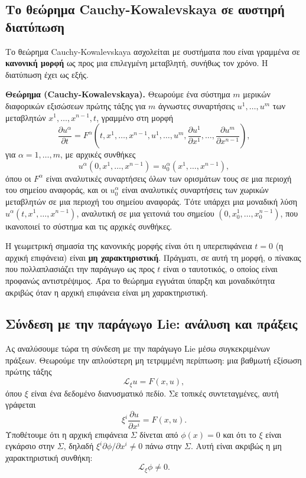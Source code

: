 \documentclass[12pt]{article}
\begin{document}
\subsection{Το θεώρημα Cauchy-Kowalevskaya σε αυστηρή διατύπωση}

Το θεώρημα Cauchy-Kowalevskaya ασχολείται με συστήματα που είναι γραμμένα σε \textbf{κανονική μορφή} ως προς μια επιλεγμένη μεταβλητή, συνήθως τον χρόνο. Η διατύπωση έχει ως εξής.

\textbf{Θεώρημα (Cauchy-Kowalevskaya).} Θεωρούμε ένα σύστημα $m$ μερικών διαφορικών εξισώσεων πρώτης τάξης για $m$ άγνωστες συναρτήσεις $u^1, \dots, u^m$ των μεταβλητών $x^1, \dots, x^{n-1}, t$, γραμμένο στη μορφή
\begin{equation}
\frac{\partial u^\alpha}{\partial t} = F^\alpha \left( t, x^1, \dots, x^{n-1}, u^1, \dots, u^m, \frac{\partial u^1}{\partial x^1}, \dots, \frac{\partial u^m}{\partial x^{n-1}} \right),
\end{equation}
για $\alpha = 1, \dots, m$, με αρχικές συνθήκες
\begin{equation}
u^\alpha(0, x^1, \dots, x^{n-1}) = u_0^\alpha(x^1, \dots, x^{n-1}),
\end{equation}
όπου οι $F^\alpha$ είναι αναλυτικές συναρτήσεις όλων των ορισμάτων τους σε μια περιοχή του σημείου αναφοράς, και οι $u_0^\alpha$ είναι αναλυτικές συναρτήσεις των χωρικών μεταβλητών σε μια περιοχή του σημείου αναφοράς. Τότε υπάρχει μια μοναδική λύση $u^\alpha(t, x^1, \dots, x^{n-1})$, αναλυτική σε μια γειτονιά του σημείου $(0, x_0^1, \dots, x_0^{n-1})$, που ικανοποιεί το σύστημα και τις αρχικές συνθήκες.

Η γεωμετρική σημασία της κανονικής μορφής είναι ότι η υπερεπιφάνεια $t = 0$ (η αρχική επιφάνεια) είναι \textbf{μη χαρακτηριστική}. Πράγματι, σε αυτή τη μορφή, ο πίνακας που πολλαπλασιάζει την παράγωγο ως προς $t$ είναι ο ταυτοτικός, ο οποίος είναι προφανώς αντιστρέψιμος. Άρα το θεώρημα εγγυάται ύπαρξη και μοναδικότητα ακριβώς όταν η αρχική επιφάνεια είναι μη χαρακτηριστική.

\subsection{Σύνδεση με την παράγωγο Lie: ανάλυση και πράξεις}

Ας αναλύσουμε τώρα τη σύνδεση με την παράγωγο Lie μέσω συγκεκριμένων πράξεων. Θεωρούμε την απλούστερη μη τετριμμένη περίπτωση: μια βαθμωτή εξίσωση πρώτης τάξης
\[
\mathcal{L}_\xi u = F(x, u),
\]
όπου $\xi$ είναι ένα δεδομένο διανυσματικό πεδίο. Σε τοπικές συντεταγμένες, αυτή γράφεται
\begin{equation}
\xi^i \frac{\partial u}{\partial x^i} = F(x, u).
\end{equation}
Υποθέτουμε ότι η αρχική επιφάνεια $\Sigma$ δίνεται από $\phi(x) = 0$ και ότι το $\xi$ είναι εγκάρσιο στην $\Sigma$, δηλαδή $\xi^i \partial \phi / \partial x^i \neq 0$ πάνω στην $\Sigma$. Αυτή είναι ακριβώς η μη χαρακτηριστική συνθήκη:
\begin{equation}
\mathcal{L}_\xi \phi \neq 0.
\end{equation}
\end{document}
